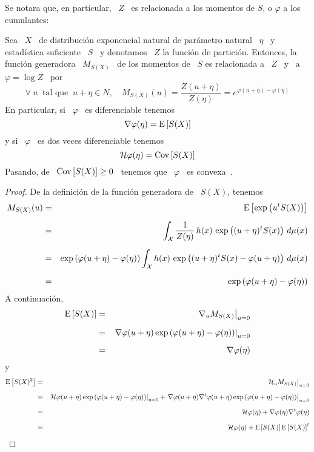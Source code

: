 Se notara que,  en particular, \ $Z$ \  es relacionada a los momentos  de $S$, o
$\varphi$ a los cumulantes:
%
\begin{teorema}
%
  Sea \  $X$ \  de distribuci\'on exponencial  natural de par\'ametro  natural \
  $\eta$ \ y estad\'istica suficiente \ $S$  \ y denotamos \ $Z$ la funci\'on de
  partici\'on. Entonces, la funci\'on generadora  \ $M_{S(X)}$ \ de los momentos
  de \ $S$ es relacionada a \ $Z$ \ y \ a \ $\varphi = \log Z$ \ por
  \[
  \forall \: u \: \mbox{ tal que } \: u+\eta \in N, \quad M_{S(X)}(u) = \frac{Z(u+\eta)}{Z(\eta)} =
  e^{\varphi(u+\eta) - \varphi(\eta)}
  \]
  En particular, si \  $\varphi$ \ es diferenciable tenemos
  \[
  \nabla \varphi (\eta) = \operatorname{E}\left[ S(X) \right]
  \]
  y si \ $\varphi$ \ es dos veces diferenciable tenemos
  \[
  \mathcal{H} \varphi (\eta) = \operatorname{Cov}\left[ S(X) \right]
  \]
  Pasando,  de \  $\operatorname{Cov}\left[ S(X)  \right] \ge  0$ \ tenemos  que \  $\varphi$  \ es
  convexa~\cite{CamMar09}.
%
\end{teorema}
%
\begin{proof}
  De la definici\'on de la funci\'on generadora de \ $S(X)$, tenemos
  \begin{eqnarray*}
  M_{S(X)}(u) & = &\operatorname{E}\left[ \exp\left( u^t S(X) \right) \right]\\[2mm]
  & = & \int_{\mathcal{X}} \frac{1}{Z(\eta)} \, h(x) \, \exp\left( (u + \eta)^t S(x) \right) \,
  d\mu(x)\\[2mm]
  & = & \exp\left( \varphi(u+\eta) - \varphi(\eta) \right) \int_{\mathcal{X}} h(x) \,
  \exp\left( (u + \eta)^t S(x) - \varphi(u+\eta) \right) \, d\mu(x)\\[2mm]
  & = & \exp\left( \varphi(u+\eta) - \varphi(\eta) \right)
  \end{eqnarray*}
  A continuaci\'on,
  \begin{eqnarray*}
  \operatorname{E}\left[ S(X) \right] & = & \left. \nabla_u M_{S(X)} \right|_{u=0}\\[2mm]
  & = & \left. \nabla \varphi(u+\eta) \exp\left( \varphi(u+\eta) - \varphi(\eta) \right) \right|_{u=0}\\[2mm]
  & = & \nabla \varphi(\eta)
  \end{eqnarray*}
  y
  \begin{eqnarray*}
  \operatorname{E}\left[ S(X)^2 \right] & = & \left. \mathcal{H}_u M_{S(X)} \right|_{u=0}\\[2mm]
  & = & \left. \mathcal{H} \varphi(u+\eta) \exp\left( \varphi(u+\eta) - \varphi(\eta)
  \right) \right|_{u=0} + \left. \nabla \varphi(u+\eta) \nabla^t \varphi(u+\eta)
  \exp\left( \varphi(u+\eta) - \varphi(\eta) \right) \right|_{u=0}\\[2mm]
  & = & \mathcal{H} \varphi(\eta) + \nabla \varphi(\eta) \nabla^t \varphi(\eta)\\[2mm]
  & = & \mathcal{H} \varphi(\eta) + \operatorname{E}\left[ S(X) \right] \operatorname{E}\left[ S(X) \right]^t
  \end{eqnarray*}
\end{proof}



